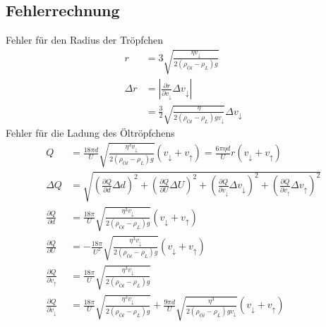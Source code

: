 \subsection{Fehlerrechnung}
Fehler für den Radius der Tröpfchen
\begin{align*}
	r &= 3 \sqrt{\frac{\eta v_\downarrow}{2(\rho_{Öl} - \rho_L)g}} \\
	\Delta r &= \left|\frac{\partial r}{\partial v_\downarrow} \Delta v_\downarrow\right| \\
	&= \frac{3}{2} \sqrt{\frac{\eta}{2(\rho_{Öl} - \rho_L)gv_\downarrow}} \Delta v_\downarrow
\end{align*}
Fehler für die Ladung des Öltröpfchens
\begin{align*}
	Q &= \frac{18\pi d}{U} \sqrt{\frac{\eta^3 v_\downarrow}{2(\rho_{Öl} - \rho_L)g}}(v_\downarrow + v_\uparrow) = \frac{6\pi\eta d}{U} r (v_\downarrow + v_\uparrow) \\
	\Delta Q &= \sqrt{\left(\frac{\partial Q}{\partial d} \Delta d\right)^2 + 
					\left(\frac{\partial Q}{\partial U} \Delta U\right)^2 + 
					\left(\frac{\partial Q}{\partial v_\downarrow} \Delta v_\downarrow\right)^2 + 
					\left(\frac{\partial Q}{\partial v_\uparrow} \Delta  v_\uparrow\right)^2} \\
	\frac{\partial Q}{\partial d} &= \frac{18\pi}{U} \sqrt{\frac{\eta^3 v_\downarrow}{2(\rho_{Öl} - \rho_L)g}}(v_\downarrow + v_\uparrow) \\
	\frac{\partial Q}{\partial U} &= -\frac{18\pi}{U^2} \sqrt{\frac{\eta^3 v_\downarrow}{2(\rho_{Öl} - \rho_L)g}}(v_\downarrow + v_\uparrow) \\
	\frac{\partial Q}{\partial v_\uparrow} &= \frac{18\pi}{U} \sqrt{\frac{\eta^3 v_\downarrow}{2(\rho_{Öl} - \rho_L)g}} \\
	\frac{\partial Q}{\partial v_\downarrow} &= \frac{18\pi}{U} \sqrt{\frac{\eta^3 v_\downarrow}{2(\rho_{Öl} - \rho_L)g}} + \frac{9\pi d}{U} \sqrt{\frac{\eta^3 }{2(\rho_{Öl} - \rho_L)gv_\downarrow}}(v_\downarrow + v_\uparrow) \\
\end{align*}